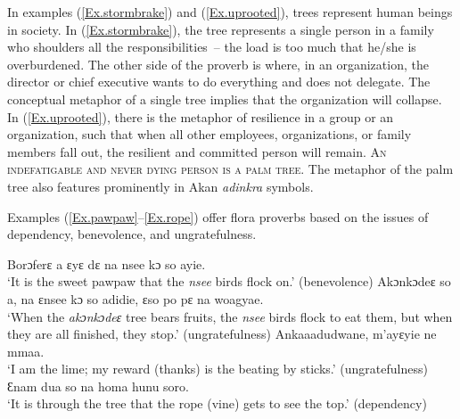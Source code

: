 \documentclass[output=paper,colorlinks,citecolor=brown]{langscibook}
\begin{document}
In examples (\ref{Ex.stormbrake}) and (\ref{Ex.uprooted}), trees represent human beings in society. In (\ref{Ex.stormbrake}), the tree represents a single person in a family who shoulders all the responsibilities~-- the load is too much that he\slash she is overburdened. The other side of the proverb is where, in an organization, the director or chief executive wants to do everything and does not delegate. The conceptual metaphor of a single tree implies that the organization will collapse. In (\ref{Ex.uprooted}), there is the metaphor of resilience in a group or an organization, such that when all other employees, organizations, or family members fall out, the resilient and committed person will remain. \textsc{An indefatigable and never dying person is a palm tree}. The metaphor of the palm tree also features prominently in Akan \textit{adinkra} symbols. 

Examples (\ref{Ex.pawpaw}--\ref{Ex.rope}) offer flora proverbs based on the issues of dependency, benevolence, and ungratefulness.

\ea \label{Ex.pawpaw}
\gl Borɔferɛ a ɛyɛ dɛ na nsee kɔ so ayie.\\
\glt  ‘It is the sweet pawpaw that the \textit{nsee} birds flock on.' (benevolence)
\ex \label{Ex.treebearfruit}
\gl Akɔnkɔdeɛ so a, na ɛnsee kɔ so adidie, ɛso po pɛ na woagyae.\\
\glt  ‘When the \textit{akɔnkɔdeɛ} tree bears fruits, the \textit{nsee} birds flock to eat them, but when they are all finished, they stop.' (ungratefulness)
\ex \label{Ex.beatingstick}
\gl Ankaaadudwane,	 m’ayɛyie 	ne 	mmaa.\\
\glt  ‘I am the lime; my reward (thanks) is the beating by sticks.' (ungratefulness)
\ex \label{Ex.rope}
\gl Ɛnam dua so na homa hunu soro.\\
\glt  ‘It is through the tree that the rope (vine) gets to see the top.' (dependency)
\z
\end{document}
